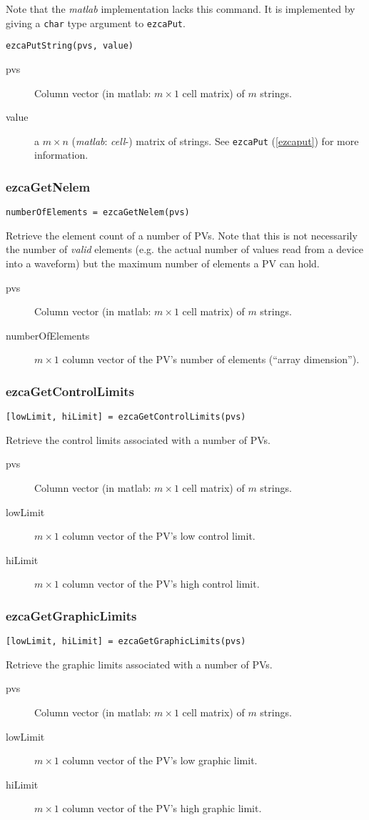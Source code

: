 \documentclass{article}
\newcommand{\matlab}{{\em matlab}}
\newcommand{\com}[1]{{\tt #1}}
\newcommand{\PVITEM}{
\item[pvs] Column vector (in matlab: $m\times 1$ cell matrix)
of $m$ strings.
}
\begin{document}
Note that the \matlab{} implementation lacks this command. It is implemented
by giving a \com{char}{} type argument to \com{ezcaPut}.
\begin{verbatim}
ezcaPutString(pvs, value)
\end{verbatim}
\begin{description}
\PVITEM
%
%
\item[value] a $m\times n$ (\matlab: {\em cell}-) matrix of strings. See \com{ezcaPut}{}
(\ref{ezcaput}) for more information.
\end{description}


\subsubsection{ezcaGetNelem}
\begin{verbatim}
numberOfElements = ezcaGetNelem(pvs)
\end{verbatim}
Retrieve the element count of a number of PVs. Note that this is not
necessarily the number of {\em valid} elements (e.g. the actual number
of values read from a device into a waveform) but the maximum number
of elements a PV can hold.
\begin{description}
\PVITEM
\item[numberOfElements] $m\times 1$ column vector of the PV's number
of elements (``array dimension'').
\end{description}

\subsubsection{ezcaGetControlLimits}
\begin{verbatim}
[lowLimit, hiLimit] = ezcaGetControlLimits(pvs)
\end{verbatim}
Retrieve the control limits associated with a number of PVs.
\begin{description}
\PVITEM
\item[lowLimit] $m\times 1$ column vector of the PV's low control limit.
\item[hiLimit]  $m\times 1$ column vector of the PV's high control limit.
\end{description}


\subsubsection{ezcaGetGraphicLimits}
\begin{verbatim}
[lowLimit, hiLimit] = ezcaGetGraphicLimits(pvs)
\end{verbatim}
Retrieve the graphic limits associated with a number of PVs.
\begin{description}
\PVITEM
\item[lowLimit] $m\times 1$ column vector of the PV's low graphic limit.
\item[hiLimit]  $m\times 1$ column vector of the PV's high graphic limit.
\end{description}
\end{document}
